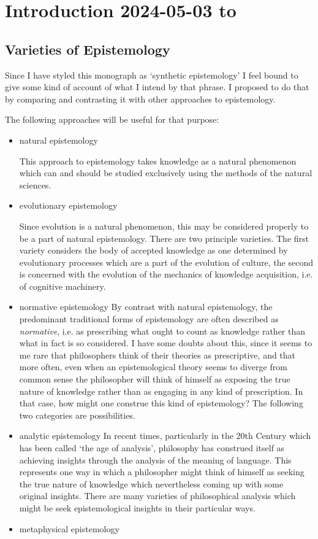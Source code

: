 \documentclass[10pt,titlepage]{book}
\begin{document}
\chapter{Introduction 2024-05-03 to }

\section{Varieties of Epistemology}

Since I have styled this monograph as `synthetic epistemology' I feel bound to give some kind of account of what I intend by that phrase.
I proposed to do that by comparing and contrasting it with other approaches to epistemology.

The following approaches will be useful for that purpose:

\begin{itemize}
\item natural epistemology

  This approach to epistemology takes knowledge as a natural phenomenon which can and should be studied exclusively using the methods of the natural sciences.
  
\item evolutionary epistemology

  Since evolution is a natural phenomenon, this may be considered properly to be a part of natural epistemology.
  There are two principle varieties.
  The first variety considers the body of accepted knowledge as one determined by evolutionary processes which are a part of the evolution of culture, the second is concerned with the evolution of the mechanics of knowledge acquisition, i.e. of cognitive machinery.
\item normative epistemology
  By contrast with natural epistemology, the predominant traditional forms of epistemology are often described as \emph{normative}, i.e. as prescribing what ought to count as knowledge rather than what in fact is so considered.
  I have some doubts about this, since it seems to me rare that philosophers think of their theories as prescriptive, and that more often, even when an epistemological theory seems to diverge from common sense the philosopher will think of himself as exposing the true nature of knowledge rather than as engaging in any kind of prescription.
  In that case, how might one construe this kind of epistemology?
  The following two categories are possibilities.
\item analytic epistemology
  In recent times, particularly in the 20th Century which has been called `the age of analysis', philosophy has construed itself as achieving insights through the analysis of the meaning of language.
  This represents one way in which a philosopher might think of himself as seeking the true nature of knowledge which nevertheless coming up with some original insights.
  There are many varieties of philosophical analysis which might be seek epistemological insights in their particular ways.
  \item metaphysical epistemology
\end{itemize}
\end{document}
